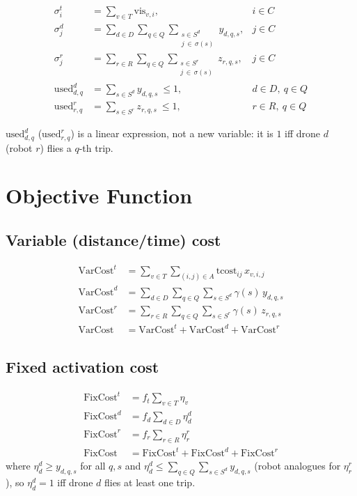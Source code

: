\documentclass[10pt]{article}
\begin{document}
\begin{align}
\sigma^t_i &= \sum_{v\in T} \mathrm{vis}_{v,i}, & i\in C \label{eq:truck-service}\\
\sigma^d_j &= \sum_{d\in D}\sum_{q\in Q}\sum_{\substack{s\in S^d\\ j\,\in\,\sigma(s)}} y_{d,q,s}, & j\in C \label{eq:drone-service}\\
\sigma^r_j &= \sum_{r\in R}\sum_{q\in Q}\sum_{\substack{s\in S^r\\ j\,\in\,\sigma(s)}} z_{r,q,s}, & j\in C \label{eq:robot-service}\\
\mathrm{used}^d_{d,q} &= \sum_{s\in S^d} y_{d,q,s}\ \le 1, & d\in D,\ q\in Q \label{eq:used-drone-trip}\\
\mathrm{used}^r_{r,q} &= \sum_{s\in S^r} z_{r,q,s}\ \le 1, & r\in R,\ q\in Q \label{eq:used-robot-trip}
\end{align}

\noindent $\mathrm{used}^d_{d,q}$ ($\mathrm{used}^r_{r,q}$) is a linear
expression, not a new variable: it is $1$ iff drone $d$ (robot $r$) flies a
$q$-th trip.

\section{Objective Function}
\label{sec:objective}

\subsection{Variable (distance/time) cost}
\begin{align}
\mathrm{VarCost}^t &= \sum_{v\in T}\sum_{(i,j)\in A} \mathrm{tcost}_{ij}\,x_{v,i,j} \label{eq:varcost-truck}\\
\mathrm{VarCost}^d &= \sum_{d\in D}\sum_{q\in Q}\sum_{s\in S^d} \gamma(s)\,y_{d,q,s} \label{eq:varcost-drone}\\
\mathrm{VarCost}^r &= \sum_{r\in R}\sum_{q\in Q}\sum_{s\in S^r} \gamma(s)\,z_{r,q,s} \label{eq:varcost-robot}\\
\mathrm{VarCost} &= \mathrm{VarCost}^t + \mathrm{VarCost}^d + \mathrm{VarCost}^r \label{eq:varcost-total}
\end{align}

\subsection{Fixed activation cost}
\begin{align}
\mathrm{FixCost}^t &= f_t \sum_{v\in T} \eta_v \label{eq:fixcost-truck}\\
\mathrm{FixCost}^d &= f_d \sum_{d\in D} \eta^d_d \label{eq:fixcost-drone}\\
\mathrm{FixCost}^r &= f_r \sum_{r\in R} \eta^r_r \label{eq:fixcost-robot}\\
\mathrm{FixCost} &= \mathrm{FixCost}^t + \mathrm{FixCost}^d + \mathrm{FixCost}^r \label{eq:fixcost-total}
\end{align}
where $\eta^d_d \ge y_{d,q,s}$ for all $q,s$ and
$\eta^d_d \le \sum_{q\in Q}\sum_{s\in S^d} y_{d,q,s}$
(robot analogues for $\eta^r_r$), so $\eta^d_d = 1$ iff drone $d$ flies at
least one trip.
\end{document}
